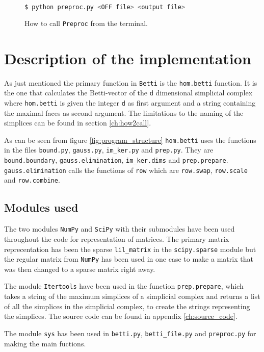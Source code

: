 \documentclass[11pt,a4paper,twoside]{report}
\begin{document}
\begin{figure}[H]
\begin{lstlisting}[language=bash]
$ python preproc.py <OFF file> <output file> 
\end{lstlisting}
\caption{How to call \texttt{Preproc} from the terminal.}
\label{fig:preproc}
\end{figure}

\section{Description of the implementation}
As just mentioned the primary function in \texttt{Betti} is the \texttt{hom.betti} function. It is the one that calculates the Betti-vector of the \texttt{d} dimensional simplicial complex where \texttt{hom.betti} is given the integer \texttt{d} as first argument and a string containing the maximal faces as second argument. The limitations to the naming of the simplices can be found in section \ref{ch:how2call}. 

As can be seen from figure \ref{fig:program_structure} \texttt{hom.betti} uses the functions in the files \texttt{bound.py}, \texttt{gauss.py}, \texttt{im\_ker.py} and \texttt{prep.py}. They are \texttt{bound.boundary}, \texttt{gauss.elimination}, \texttt{im\_ker.dims} and \texttt{prep.prepare}. \texttt{gauss.elimination} calls the functions of \texttt{row} which are \texttt{row.swap}, \texttt{row.scale} and \texttt{row.combine}.

\subsection{Modules used}
The two modules \texttt{NumPy} and \texttt{SciPy} with their submodules have been used throughout the code for representation of matrices. The primary matrix reprecentation has been the sparse \texttt{lil\_matrix} in the \texttt{scipy.sparse} module but the regular matrix from \texttt{NumPy} has been used in one case to make a matrix that was then changed to a sparse matrix right away. 

The module \texttt{Itertools} have been used in the function \texttt{prep.prepare}, which takes a string of the maximum simplices of a simplicial complex and returns a list of all the simplices in the simplicial complex, to create the strings representing the simplices. The source code can be found in appendix \ref{ch:source_code}.

The module \texttt{sys} has been used in \texttt{betti.py}, \texttt{betti\_file.py} and \texttt{preproc.py} for making the main fuctions.
\end{document}
